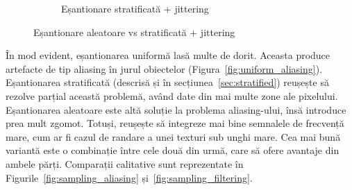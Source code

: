 \documentclass[12pt,a4paper]{report}
\numberwithin{equation}{section} %
\begin{document}
\begin{figure}[ht]
\begin{subfigure}[h]{0.45\linewidth}
		\caption{Eșantionare stratificată + jittering}
	\end{subfigure}
	\caption{Eșantionare aleatoare vs stratificată + jittering\protect{}}
	\label{fig:random_sampling}
\end{figure}

În mod evident, eșantionarea uniformă lasă multe de dorit. Aceasta produce artefacte
de tip aliasing în jurul obiectelor (Figura~\ref{fig:uniform_aliasing}). Eșantionarea
stratificată (descrisă și în secțiunea~\ref{sec:stratified}) reușește să rezolve parțial
această problemă, având date din mai multe zone ale pixelului. Eșantionarea aleatoare
este altă soluție la problema aliasing-ului, însă introduce prea mult zgomot. Totuși,
reușește să integreze mai bine semnalele de frecvență mare, cum ar fi cazul de randare
a unei texturi sub unghi mare.
Cea mai bună variantă este o combinație între cele două din urmă, care să ofere
avantaje din ambele părți. Comparații calitative sunt reprezentate în Figurile~\ref{fig:sampling_aliasing} și~\ref{fig:sampling_filtering}.
\end{document}

